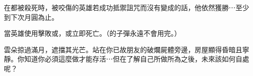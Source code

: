 在都被殺死時，被咬傷的英雄若成功抵禦詛咒而沒有變成的話，他依然獲勝⋯至少到下次月圓為止。

當英雄使用擊敗或，或立即死亡。（的子彈永遠不會用完。）

\begin{HauntStory}
	雲朵掠過滿月，遮擋其光芒。站在你已故朋友的破爛屍體旁邊，房屋顯得昏暗且寧靜。你知道你必須這麼做才能存活⋯但在了解自己所做所為之後，未來該如何自處呢？
\end{HauntStory}
